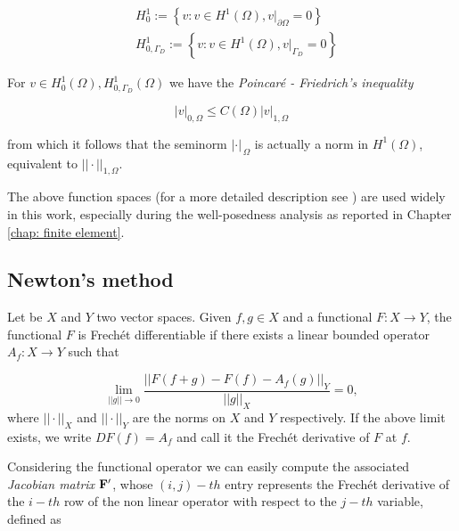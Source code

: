 \begin{align}
& H^1_0 :=  \left\{   v : v \in H^1(\Omega), v|_{\partial \Omega} = 0\right\} \label{space: h1 zero} \\
& H^1_{0,\Gamma_D} :=  \left\{   v : v \in H^1(\Omega), v|_{\Gamma_D} = 0\right\} \label{space: h1 zero gamma}
\end{align} 

For $v \in H^1_0(\Omega),H^1_{0,\Gamma_D}(\Omega)$ we have the \textit{Poincar\'e - Friedrich's inequality} \cite{salsa:EDP}

\begin{equation}
\label{eq: poincarre inequality}
|v|_{0,\Omega} \leq C(\Omega) |v|_{1,\Omega}
\end{equation}

from which it follows that the seminorm $|\cdot |_{\,\Omega}$ is actually a norm in $H^1(\Omega)$, equivalent to $||\cdot ||_{1,\Omega}$.

The above function spaces (for a more detailed description see \cite{Adams:SobolevSpaces}) are used widely in this work, especially during the well-posedness analysis as reported in Chapter \ref{chap: finite element}.


\subsection{Newton's method}

\begin{Definizione}
Let be $X$ and $Y$ two vector spaces. Given $f,g \in X$ and a functional $F:X\rightarrow Y$, the functional $F$ is Frech\'et differentiable if there exists a linear bounded operator $A_f:X\rightarrow Y$ such that

\begin{equation}
\lim_{||g||\to 0}\dfrac{||F(f+g)-F(f)-A_f(g)||_Y}{||g||_X} = 0 ,
\end{equation}
where $||\cdot ||_X$ and $||\cdot ||_Y$ are the norms on $X$ and $Y$ respectively.
If the above limit exists, we write $DF(f)=A_f$ and call it the Frech\'et derivative of $F$ at $f$.
\end{Definizione}


Considering the functional operator  we can easily compute the associated \textit{Jacobian matrix} $\mathbf{F}'$, whose $(i,j)-th$ entry represents the Frech\'et derivative of the $i-th$ row of the non linear operator with respect to the $j-th$ variable, defined as


